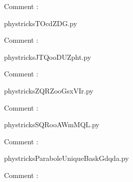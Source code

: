     Comment : 

    \clearpage
    


    \newcommand{\CaptionFigTOcdZDG}{<+Type your caption here+>}
    \begin{center}
        
    \end{center}
    phystricksTOcdZDG.py

    Comment : 

    \clearpage
    


    \newcommand{\CaptionFigJTQooDUZpht}{<+Type your caption here+>}
    \begin{center}
        
    \end{center}
    phystricksJTQooDUZpht.py

    Comment : 

    \clearpage
    


    \newcommand{\CaptionFigZQRZooGsxVIr}{<+Type your caption here+>}
    \begin{center}
        
    \end{center}
    phystricksZQRZooGsxVIr.py

    Comment : 

    \clearpage
    


    \newcommand{\CaptionFigSQRooAWmMQL}{<+Type your caption here+>}
    \begin{center}
        
    \end{center}
    phystricksSQRooAWmMQL.py

    Comment : 

    \clearpage
    


    \newcommand{\CaptionFigParaboleUniqueBaskGdqda}{<+Type your caption here+>}
    \begin{center}
        
    \end{center}
    phystricksParaboleUniqueBaskGdqda.py

    Comment : 

    \clearpage
    

